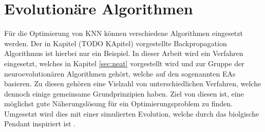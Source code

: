 \section{Evolutionäre Algorithmen}
\label{sec:evolutionary_algos}
Für die Optimierung von \ac{KNN} können verschiedene Algorithmen eingesetzt werden. Der in Kapitel (TODO KApitel) vorgestellte Backpropagation Algorithmus ist hierbei nur ein Beispiel. In dieser Arbeit wird ein Verfahren eingesetzt, welches in Kapitel \ref{sec:neat} vorgestellt wird und zur Gruppe der neuroevolutionären Algorithmen gehört, welche auf den sogenannten \acp{EA} basieren. Zu diesen gehören eine Vielzahl von unterschiedlichen Verfahren, welche dennoch einige gemeinsame Grundprinzipien haben. Ziel von diesen ist, eine möglichst gute Näherungslösung für ein Optimierungsproblem zu finden. Umgesetzt wird dies mit einer simulierten Evolution, welche durch das biolgische Pendant inspiriert ist \cite{weicker2015evolutionare}.

